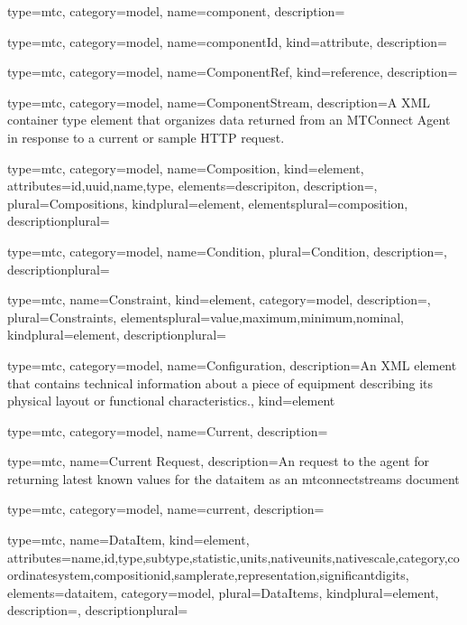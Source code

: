 {
  type=mtc,
  category=model,
  name={component},
  description={}
}


{
  type=mtc,
  category=model,
  name={componentId},
  kind={attribute},
  description={}
}


{
  type=mtc,
  category=model,
  name={ComponentRef},
  kind={reference},
  description={} 
}


{
  type=mtc,
  category=model,
  name={ComponentStream},
  description={A XML container type element that organizes data returned from an MTConnect Agent in response to a current or sample HTTP request.} 
}


{
  type=mtc,
  category=model,
  name={Composition},
  kind={element},
  attributes={\gls{id},\gls{uuid},\gls{name},\gls{type}},
  elements={\gls{descripiton}},
  description={},
  plural={Compositions},
  kindplural={element},
  elementsplural={\gls{composition}},
  descriptionplural={}
}


{
  type=mtc,
  category=model,
  name={Condition},
  plural={Condition},
  description={},
  descriptionplural={}
}


{
  type=mtc,
  name={Constraint},
  kind={element},
  category=model,
  description={},
  plural={Constraints},
  elementsplural={\gls{value},\gls{maximum},\gls{minimum},\gls{nominal}},
  kindplural={element},
  descriptionplural={}
}


{
  type=mtc,
  category=model,
  name={Configuration},
  description={An XML element that contains technical information about a piece of equipment describing its physical layout or functional characteristics.},
  kind={element}
}


{
  type=mtc,
  category=model,
  name={Current},
  description={}
}


{
  type=mtc,
  name={Current Request},
  description={An  request to the \gls{agent} for returning latest known values for the \gls{dataitem} as an \glspl{mtconnectstream}  document}
}


{
  type=mtc,
  category=model,
  name={current},
  description={}
}


{
  type=mtc,
  name={DataItem},
  kind={element},
  attributes={\gls{name},\gls{id},\gls{type},\gls{subtype},\gls{statistic},\gls{units},\gls{nativeunits},\gls{nativescale},\gls{category},\gls{coordinatesystem},\gls{compositionid},\gls{samplerate},\gls{representation},\gls{significantdigits}},
  elements={\gls{dataitem}},
  category=model,
  plural={DataItems},
  kindplural={element},
  description={},
  descriptionplural={}
}


